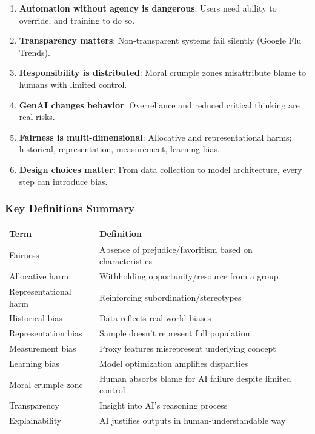 \begin{enumerate}
  \item \textbf{Automation without agency is dangerous}: Users need ability to override, and training to do so.
  \item \textbf{Transparency matters}: Non-transparent systems fail silently (Google Flu Trends).
  \item \textbf{Responsibility is distributed}: Moral crumple zones misattribute blame to humans with limited control.
  \item \textbf{GenAI changes behavior}: Overreliance and reduced critical thinking are real risks.
  \item \textbf{Fairness is multi-dimensional}: Allocative and representational harms; historical, representation, measurement, learning bias.
  \item \textbf{Design choices matter}: From data collection to model architecture, every step can introduce bias.
\end{enumerate}

\subsubsection*{Key Definitions Summary}

\begin{center}
\renewcommand{\arraystretch}{1.3}
\begin{tabular}{@{} l p{8cm} @{}}
\toprule
\textbf{Term} & \textbf{Definition} \\
\midrule
Fairness & Absence of prejudice/favoritism based on characteristics \\
Allocative harm & Withholding opportunity/resource from a group \\
Representational harm & Reinforcing subordination/stereotypes \\
Historical bias & Data reflects real-world biases \\
Representation bias & Sample doesn't represent full population \\
Measurement bias & Proxy features misrepresent underlying concept \\
Learning bias & Model optimization amplifies disparities \\
Moral crumple zone & Human absorbs blame for AI failure despite limited control \\
Transparency & Insight into AI's reasoning process \\
Explainability & AI justifies outputs in human-understandable way \\
\bottomrule
\end{tabular}
\end{center}

